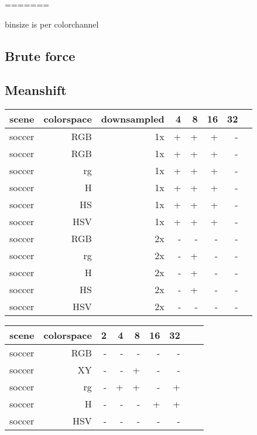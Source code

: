 \documentclass[a4paper,11pt]{article}
\begin{document}

=======

	binsize is per colorchannel

	\subsection{Brute force} 

	\subsection{Meanshift} 

	\begin{tabular}{l*{7}{r|}}
		\label{table:fase1}
		scene	& 	colorspace	& downsampled & 4 & 8 & 16 & 32\\

		\hline
		soccer 	& 	RGB	 		& 1x		  			  & + & + & +  &  -\\
		soccer 	& 	RGB	 		& 1x		  			  & + & + & +  &  -\\
		soccer 	& 	rg	 		& 1x 		  			  & + & + & +  &  -\\
		soccer 	& 	H	 		& 1x		 			  & + & + & +  &  -\\
		soccer 	& 	HS	 		& 1x		  			  & + & + & +  &  -\\
		soccer 	& 	HSV	 		& 1x		  			  & + & + & +  &  -\\
		soccer 	& 	RGB	 		& 2x		  			  & - & - & -  &  -\\
		soccer 	& 	rg	 		& 2x 		  			  & - & + & -  &  -\\
		soccer 	& 	H	 		& 2x		  			  & - & + & -  &  -\\
		soccer 	& 	HS	 		& 2x		  			  & - & + & -  &  -\\
		soccer 	& 	HSV	 		& 2x		  			  & - & - & -  &  -\\

	\end{tabular}	

	\begin{tabular}{l*{8}{r|}}
		scene	& 	colorspace	&  2 & 4 & 8 & 16 & 32\\
		\hline
		soccer 	& 	RGB	 		&  - & - & - & - & -\\
		soccer 	& 	XY	 		&  - & - & + & - & -\\
		soccer 	& 	rg	 		&  - & + & + & - & +\\
		soccer 	& 	H	 		&  - & - & - & + & +\\
		soccer 	& 	HSV	 		&  - & - & - & - & -\\ 
	\end{tabular}	
\end{document}
